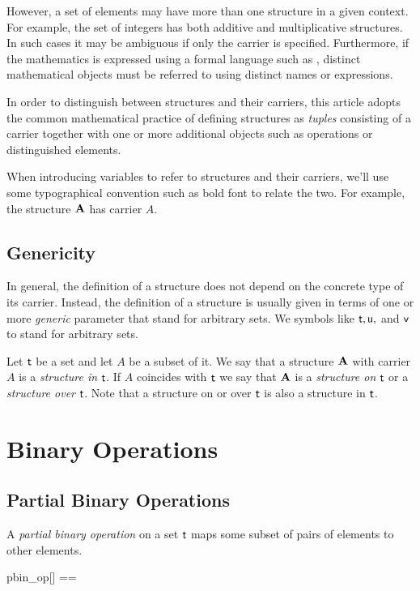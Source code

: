 \documentclass{amsart}
\begin{document}
However, a set of elements may have more than one structure in a given context.
For example, the set of integers has both additive and multiplicative structures.
In such cases it may be ambiguous if only the carrier is specified.
Furthermore, if the mathematics is expressed using a formal language such as \ZN, 
distinct mathematical objects
must be referred to using distinct names or expressions.

In order to distinguish between structures and their carriers, 
this article adopts the common mathematical practice of defining structures as \textit{tuples}
consisting of a carrier together with one or more additional objects such as operations or
distinguished elements.

When introducing variables to refer to structures and their carriers,
we'll use some typographical convention such as bold font to relate the two.
For example, the structure $\mathbf{A}$ has carrier $A$.

\subsection{Genericity}

In general, the definition of a structure does not depend on the concrete type
of its carrier.
Instead, the definition of a structure is usually given in terms of one or more \textit{generic} parameter
that stand for arbitrary sets.
We symbols like $\mathsf{t}, \mathsf{u},$  and $\mathsf{v}$ to stand for arbitrary sets. 

Let $\mathsf{t}$ be a set and let $A$ be a subset of it.
We say that a structure $\mathbf{A}$ with carrier $A$ is a \textit{structure in} $\mathsf{t}$.
If $A$ coincides with $\mathsf{t}$ we say that $\mathbf{A}$ is a \textit{structure on} $\mathsf{t}$
or a \textit{structure over} $\mathsf{t}$.
Note that a structure on or over $\mathsf{t}$ is also a structure in $\mathsf{t}$.

\section{Binary Operations}

\subsection{Partial Binary Operations}

A \textit{partial binary operation} on a set $\mathsf{t}$ maps some subset of pairs of elements to other elements.

\begin{zed}
	pbin\_op[\genT] == \genT \cross \genT \pfun \genT
\end{zed}
\end{document}
